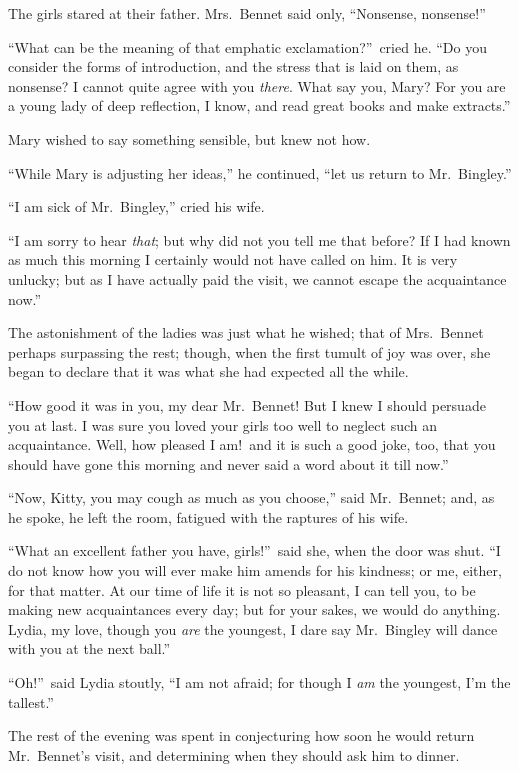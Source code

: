 \documentclass[12pt,english,oneside]{book}
\begin{document}
The girls stared at their father. Mrs.\ Bennet said only, {}``Nonsense,
nonsense!''\ 

{}``What can be the meaning of that emphatic exclamation?''\ cried
he. {}``Do you consider the forms of introduction, and the stress
that is laid on them, as nonsense? I cannot quite agree with you \textit{there}.
What say you, Mary? For you are a young lady of deep reflection, I
know, and read great books and make extracts.''

Mary wished to say something sensible, but knew not how.

{}``While Mary is adjusting her ideas,'' he continued, {}``let
us return to Mr.\ Bingley.''

{}``I am sick of Mr.\ Bingley,'' cried his wife.

{}``I am sorry to hear \textit{that}; but why did not you tell me
that before? If I had known as much this morning I certainly would
not have called on him. It is very unlucky; but as I have actually
paid the visit, we cannot escape the acquaintance now.''

The astonishment of the ladies was just what he wished; that of Mrs.\ Bennet
perhaps surpassing the rest; though, when the first tumult of joy
was over, she began to declare that it was what she had expected all
the while.

{}``How good it was in you, my dear Mr.\ Bennet! But I knew I should
persuade you at last. I was sure you loved your girls too well to
neglect such an acquaintance. Well, how pleased I am!\ and it is
such a good joke, too, that you should have gone this morning and
never said a word about it till now.''

{}``Now, Kitty, you may cough as much as you choose,'' said Mr.\ 
Bennet; and, as he spoke, he left the room, fatigued with the raptures
of his wife.

{}``What an excellent father you have, girls!''\ said she, when
the door was shut. {}``I do not know how you will ever make him amends
for his kindness; or me, either, for that matter. At our time of life
it is not so pleasant, I can tell you, to be making new acquaintances
every day; but for your sakes, we would do anything. Lydia, my love,
though you \textit{are} the youngest, I dare say Mr.\ Bingley will
dance with you at the next ball.''

{}``Oh!''\ said Lydia stoutly, {}``I am not afraid; for though
I \textit{am} the youngest, I'm the tallest.''

The rest of the evening was spent in conjecturing how soon he would
return Mr.\ Bennet's visit, and determining when they should ask
him to dinner.
\end{document}
